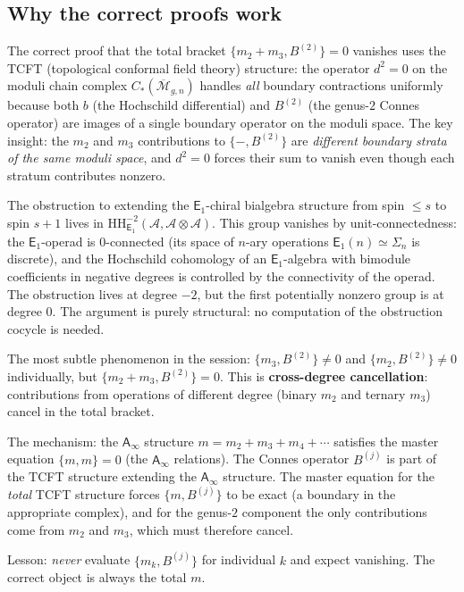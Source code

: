 \documentclass[11pt]{article}
\newcommand{\cA}{\mathcal{A}}
\newcommand{\cM}{\mathcal{M}}
\newcommand{\Eone}{\mathsf{E}_1}
\newcommand{\Ainf}{\mathsf{A}_{\infty}}
\newcommand{\HH}{\mathrm{HH}}
\begin{document}
\subsection{Why the correct proofs work}
\label{subsec:why-proofs-work}

\begin{observation}
\label{obs:tcft-proof}
The correct proof that the total bracket $\{m_2 + m_3, B^{(2)}\} = 0$
vanishes uses the TCFT (topological conformal field theory) structure:
the operator $d^2 = 0$ on the moduli chain complex $C_*(\overline{\cM}_{g,n})$
handles \emph{all} boundary contractions uniformly because both $b$ (the
Hochschild differential) and $B^{(2)}$ (the genus-$2$ Connes operator)
are images of a single boundary operator on the moduli space. The key
insight: the $m_2$ and $m_3$ contributions to $\{-, B^{(2)}\}$ are
\emph{different boundary strata of the same moduli space}, and $d^2 = 0$
forces their sum to vanish even though each stratum contributes nonzero.
\end{observation}

\begin{observation}[The $\infty$-categorical proof of $\mathrm{Obs}_{\Ainf} = 0$]
\label{obs:infty-cat-proof}
The obstruction to extending the $\Eone$-chiral bialgebra structure from
spin $\leq s$ to spin $s+1$ lives in
$\HH^{-2}_{\Eone}(\cA, \cA \otimes \cA)$. This group vanishes by
unit-connectedness: the $\Eone$-operad is $0$-connected (its space of
$n$-ary operations $\Eone(n) \simeq \Sigma_n$ is discrete), and the
Hochschild cohomology of an $\Eone$-algebra with bimodule coefficients
in negative degrees is controlled by the connectivity of the operad.
The obstruction lives at degree $-2$, but the first potentially
nonzero group is at degree $0$. The argument is purely structural:
no computation of the obstruction cocycle is needed.
\end{observation}

\begin{observation}
\label{obs:cross-degree}
The most subtle phenomenon in the session: $\{m_3, B^{(2)}\} \neq 0$
and $\{m_2, B^{(2)}\} \neq 0$ individually, but
$\{m_2 + m_3, B^{(2)}\} = 0$. This is \textbf{cross-degree
cancellation}: contributions from operations of different degree
(binary $m_2$ and ternary $m_3$) cancel in the total bracket.

The mechanism: the $\Ainf$ structure $m = m_2 + m_3 + m_4 + \cdots$
satisfies the master equation $\{m, m\} = 0$ (the $\Ainf$ relations).
The Connes operator $B^{(j)}$ is part of the TCFT structure extending
the $\Ainf$ structure. The master equation for the \emph{total} TCFT
structure forces $\{m, B^{(j)}\}$ to be exact (a boundary in the
appropriate complex), and for the genus-$2$ component the only
contributions come from $m_2$ and $m_3$, which must therefore cancel.

Lesson: \emph{never} evaluate $\{m_k, B^{(j)}\}$ for individual $k$
and expect vanishing. The correct object is always the total $m$.
\end{observation}
\end{document}
